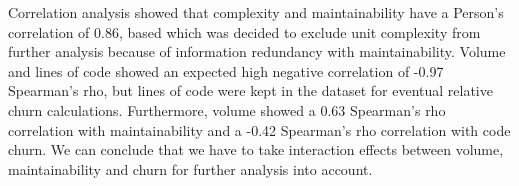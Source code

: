 Correlation analysis showed that complexity and maintainability have a Person's correlation of 0.86, based which was decided to exclude unit complexity from further analysis because of information redundancy with maintainability. Volume and lines of code showed an expected high negative correlation of -0.97 Spearman's rho, but lines of code were kept in the dataset for eventual relative churn calculations. Furthermore, volume showed a 0.63 Spearman's rho correlation with maintainability and a -0.42 Spearman's rho correlation with code churn. We can conclude that we have to take interaction effects between volume, maintainability and churn for further analysis into account.

